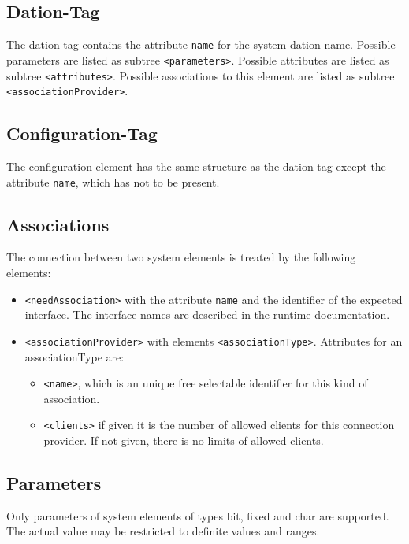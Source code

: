 \subsection{Dation-Tag}
The dation tag contains the attribute \verb|name| for the
system dation name.
Possible parameters are listed as subtree \verb|<parameters>|.
Possible attributes are listed as subtree \verb|<attributes>|.
Possible associations to this element are
 listed as subtree \verb|<associationProvider>|.


\subsection{Configuration-Tag}
The configuration element has the same structure as the dation tag
except the attribute \verb|name|, which has not to be present.

\subsection{Associations}
The connection between two system elements is treated by the following
elements:

\begin{itemize}
\item \verb|<needAssociation>| with the attribute 
 \verb|name| and the identifier of the expected interface. The 
  interface names are described in the runtime documentation. 
\item \verb|<associationProvider>|  with elements \verb|<associationType>|.
  Attributes for an associationType are:
  \begin{itemize}
   \item  \verb|<name>|,  which is an unique free selectable
     identifier for this kind of  association.
   \item \verb|<clients>|  if given it is the number of allowed
      clients for this connection provider. If not given, there is no
      limits of allowed clients.
   \end{itemize} 
\end{itemize}

\subsection{Parameters}
Only parameters of system elements of types bit, fixed and char are supported.
The actual value may be restricted to definite values and ranges.

